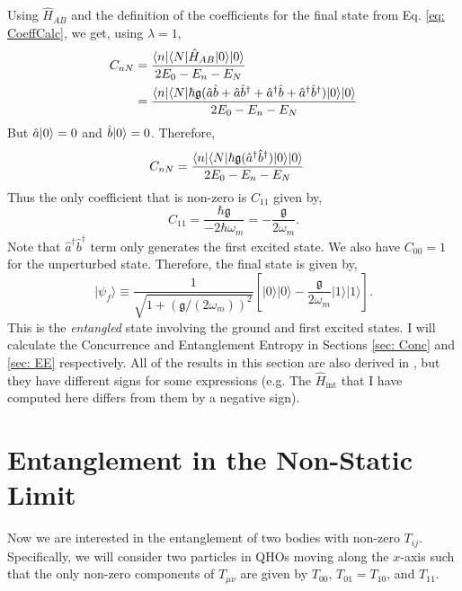 \documentclass[12pt,a4paper]{report}
\theoremstyle{plain}
\theoremstyle{definition}
\theoremstyle{remark}
\renewcommand{\dag}{\dagger}
\newcommand{\munu}{\mu\nu}
\newcommand{\Hint}{\hat{H}_{\text{int}}}
\newcommand{\Hab}{\hat{H}_{AB}}
\newcommand{\ahat}{\hat{a}}
\newcommand{\bhat}{\hat{b}}
\newcommand{\g}{\mathfrak{g}}
\DeclarePairedDelimiter\bra{\langle}{\rvert}
\DeclarePairedDelimiter\ket{\lvert}{\rangle}
\begin{document}
Using $\Hab$ and the definition of the coefficients for the final state from Eq. \ref{eq: CoeffCalc}, we get, using $\lambda = 1$,
\begin{equation}
    \begin{aligned}
         C_{nN} &= \frac{\bra{n}\bra{N}\hat{H}_{AB}\ket{0}\ket{0}}{2E_0 - E_n - E_N}\\
         &= \frac{\bra{n}\bra{N}\hbar \mathfrak{g} (\ahat\bhat+\ahat\bhat^{\dag}+\ahat^{\dag}\bhat+\ahat^{\dag}\bhat^{\dag})\ket{0}\ket{0}}{2E_0 - E_n - E_N}
    \end{aligned}
\end{equation}
But $\ahat\ket{0} = 0$ and $\bhat\ket{0} = 0$. Therefore,
\begin{equation}
    \begin{aligned}
         C_{nN} &= \frac{\bra{n}\bra{N}\hbar \mathfrak{g} (\ahat^{\dag}\bhat^{\dag})\ket{0}\ket{0}}{2E_0 - E_n - E_N}
    \end{aligned}
\end{equation}
Thus the only coefficient that is non-zero is $C_{11}$ given by,
\begin{equation}
    C_{11} = \frac{\hbar\g}{-2\hbar\omega_m} = -\frac{\g}{2\omega_m}.
\end{equation}
Note that $\ahat^{\dag}\bhat^{\dag}$ term only generates the first excited state. We also have $C_{00} = 1$ for the unperturbed state. Therefore, the final state is given by,
\begin{equation} \label{eq: finalstat}
    \vert\psi_{f}\rangle\equiv\frac{1}{\sqrt{1+(\mathfrak{g}/(2\omega_{m}))^{2}}}[\vert0\rangle\vert0\rangle-\frac{\mathfrak{g}}{2\omega_{m}}\vert1\rangle\vert1\rangle].
\end{equation}
This is the \textit{entangled} state involving the ground and first excited states. I will calculate the Concurrence and Entanglement Entropy in Sections \ref{sec: Conc} and \ref{sec: EE} respectively. All of the results in this section are also derived in \citet{Bose_2022}, but they have different signs for some expressions (e.g. The $\Hint$ that I have computed here differs from them by a negative sign).
\section{Entanglement in the Non-Static Limit}
Now we are interested in the entanglement of two bodies with non-zero $T_{ij}$. Specifically, we will consider two particles in QHOs moving along the $x$-axis such that the only non-zero components of $T_{\munu}$ are given by $T_{00}$, $T_{01} = T_{10}$, and $T_{11}$. 
\end{document}
